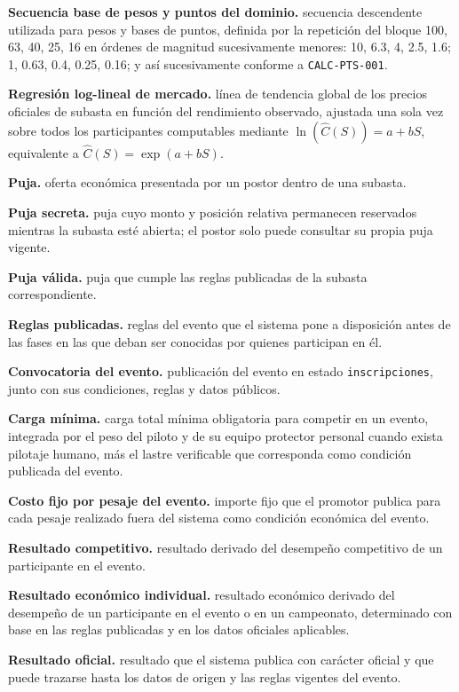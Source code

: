 \documentclass[10pt,letterpaper]{article}
\begin{document}
\noindent\textbf{Secuencia base de pesos y puntos del dominio.} secuencia descendente utilizada para pesos y bases de puntos, definida por la repetición del bloque 100, 63, 40, 25, 16 en órdenes de magnitud sucesivamente menores: 10, 6.3, 4, 2.5, 1.6; 1, 0.63, 0.4, 0.25, 0.16; y así sucesivamente conforme a \texttt{CALC-PTS-001}.\par
\noindent\textbf{Regresión log-lineal de mercado.} línea de tendencia global de los precios oficiales de subasta en función del rendimiento observado, ajustada una sola vez sobre todos los participantes computables mediante $\ln(\widehat C(S))=a+bS$, equivalente a $\widehat C(S)=\exp(a+bS)$.\par
\noindent\textbf{Puja.} oferta económica presentada por un postor dentro de una subasta.\par
\noindent\textbf{Puja secreta.} puja cuyo monto y posición relativa permanecen reservados mientras la subasta esté abierta; el postor solo puede consultar su propia puja vigente.\par
\noindent\textbf{Puja válida.} puja que cumple las reglas publicadas de la subasta correspondiente.\par
\noindent\textbf{Reglas publicadas.} reglas del evento que el sistema pone a disposición antes de las fases en las que deban ser conocidas por quienes participan en él.\par
\noindent\textbf{Convocatoria del evento.} publicación del evento en estado \texttt{inscripciones}, junto con sus condiciones, reglas y datos públicos.\par
\noindent\textbf{Carga mínima.} carga total mínima obligatoria para competir en un evento, integrada por el peso del piloto y de su equipo protector personal cuando exista pilotaje humano, más el lastre verificable que corresponda como condición publicada del evento.\par
\noindent\textbf{Costo fijo por pesaje del evento.} importe fijo que el promotor publica para cada pesaje realizado fuera del sistema como condición económica del evento.\par
\noindent\textbf{Resultado competitivo.} resultado derivado del desempeño competitivo de un participante en el evento.\par
\noindent\textbf{Resultado económico individual.} resultado económico derivado del desempeño de un participante en el evento o en un campeonato, determinado con base en las reglas publicadas y en los datos oficiales aplicables.\par
\noindent\textbf{Resultado oficial.} resultado que el sistema publica con carácter oficial y que puede trazarse hasta los datos de origen y las reglas vigentes del evento.\par
\end{document}
